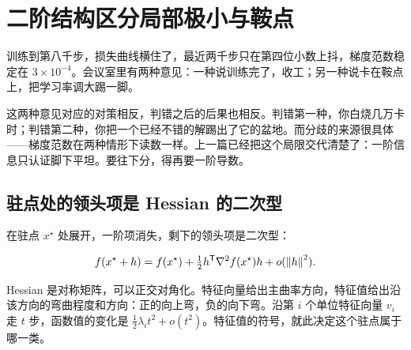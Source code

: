 \section{二阶结构区分局部极小与鞍点}
\label{sec:09-Convex-Optimization/08-Nonconvex-and-Stochastic-Optimization/02}

训练到第八千步，损失曲线横住了，最近两千步只在第四位小数上抖，梯度范数稳定在 \(3\times10^{-4}\)。会议室里有两种意见：一种说训练完了，收工；另一种说卡在鞍点上，把学习率调大踢一脚。

这两种意见对应的对策相反，判错之后的后果也相反。判错第一种，你白烧几万卡时；判错第二种，你把一个已经不错的解踢出了它的盆地。而分歧的来源很具体——梯度范数在两种情形下读数一样。上一篇已经把这个局限交代清楚了：一阶信息只认证脚下平坦。要往下分，得再要一阶导数。

\subsection{驻点处的领头项是 Hessian 的二次型}

在驻点 \(x^\star\) 处展开，一阶项消失，剩下的领头项是二次型：

\[
f(x^\star+h)=f(x^\star)+\tfrac12 h^{\mathsf{T}}\nabla^2 f(x^\star)h+o(\left\lVert h\right\rVert^2).
\]

Hessian 是对称矩阵，可以正交对角化。特征向量给出主曲率方向，特征值给出沿该方向的弯曲程度和方向：正的向上弯，负的向下弯。沿第 \(i\) 个单位特征向量 \(v_i\) 走 \(t\) 步，函数值的变化是 \(\tfrac12\lambda_i t^2+o(t^2)\)。特征值的符号，就此决定这个驻点属于哪一类。

